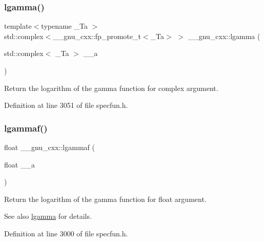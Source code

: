 \subsubsection{\texorpdfstring{lgamma()}{lgamma()}\hspace{0.1cm}{\footnotesize\ttfamily [2/2]}}
{\footnotesize\ttfamily template$<$typename \+\_\+\+Ta $>$ \\
std\+::complex$<$\+\_\+\+\_\+gnu\+\_\+cxx\+::fp\+\_\+promote\+\_\+t$<$\+\_\+\+Ta$>$ $>$ \+\_\+\+\_\+gnu\+\_\+cxx\+::lgamma (\begin{DoxyParamCaption}\item[{std\+::complex$<$ \+\_\+\+Ta $>$}]{\+\_\+\+\_\+a }\end{DoxyParamCaption})\hspace{0.3cm}{\ttfamily [inline]}}

Return the logarithm of the gamma function for complex argument. 

Definition at line 3051 of file specfun.\+h.

\mbox{\label{group__mathsf__gnu_ga37956b360838b5b2f98c8e5cfd15d307}} 
\subsubsection{\texorpdfstring{lgammaf()}{lgammaf()}\hspace{0.1cm}{\footnotesize\ttfamily [1/2]}}
{\footnotesize\ttfamily float \+\_\+\+\_\+gnu\+\_\+cxx\+::lgammaf (\begin{DoxyParamCaption}\item[{float}]{\+\_\+\+\_\+a }\end{DoxyParamCaption})\hspace{0.3cm}{\ttfamily [inline]}}

Return the logarithm of the gamma function for {\ttfamily  float } argument.

\begin{DoxySeeAlso}{See also}
\hyperlink{group__mathsf__gnu_ga40fa5127f7c419ed1d8f1c6a6f96ea9b}{lgamma} for details. 
\end{DoxySeeAlso}


Definition at line 3000 of file specfun.\+h.

\mbox{\label{group__mathsf__gnu_ga5b10ee6e92d8707a151b00086889b2ea}} 
